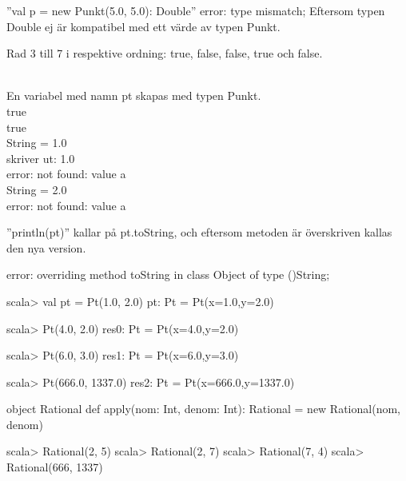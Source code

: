 ''val p = new Punkt(5.0, 5.0): Double'' error: type mismatch;
Eftersom typen Double ej är kompatibel med ett värde av typen Punkt.

\Subtask
Rad 3 till 7 i respektive ordning: true, false, false, true och false.

\Task %
\\En variabel med namn pt skapas med typen Punkt.\
\\true
\\true
\\String = 1.0
\\skriver ut: 1.0
\\error: not found: value a
\\String = 2.0
\\error: not found: value a

\Task %

\Subtask
''println(pt)'' kallar på pt.toString, och eftersom metoden är överskriven kallas den nya version.

\Subtask  {}

\Subtask
error: overriding method toString in class Object of type ()String;

\Task %

\Subtask
\begin{REPL}
scala> val pt = Pt(1.0, 2.0)
pt: Pt = Pt(x=1.0,y=2.0)

scala> Pt(4.0, 2.0)
res0: Pt = Pt(x=4.0,y=2.0)

scala> Pt(6.0, 3.0)
res1: Pt = Pt(x=6.0,y=3.0)

scala> Pt(666.0, 1337.0)
res2: Pt = Pt(x=666.0,y=1337.0)
\end{REPL}

\Subtask {}

\Subtask {}

\Subtask
\begin{REPLnonum}
object Rational {
def apply(nom: Int, denom: Int): Rational = new Rational(nom, denom)
}
\end{REPLnonum}

\Subtask
\begin{REPL}
scala> Rational(2, 5)
scala> Rational(2, 7)
scala> Rational(7, 4)
scala> Rational(666, 1337)
\end{REPL}

\Task %
\Subtask {}

